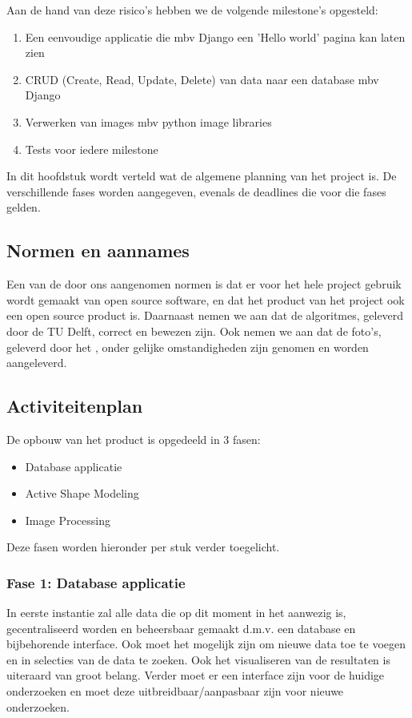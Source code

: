 Aan de hand van deze risico's hebben we de volgende milestone's opgesteld:
\begin{enumerate}
    \item Een eenvoudige applicatie die mbv Django een 'Hello world' pagina kan laten zien
    \item CRUD (Create, Read, Update, Delete) van data naar een database mbv Django
    \item Verwerken van images mbv python image libraries
    \item Tests voor iedere milestone
\end{enumerate}

In dit hoofdstuk wordt verteld wat de algemene planning van het project is. 
De verschillende fases worden aangegeven, evenals de deadlines die voor die fases gelden.


\subsection{Normen en aannames}
Een van de door ons aangenomen normen is dat er voor het hele project gebruik wordt gemaakt van open source software, en dat het product van het project ook een open source product is. 
Daarnaast nemen we aan dat de algoritmes, geleverd door de TU Delft, correct en bewezen zijn.
Ook nemen we aan dat de foto's, geleverd door het \casamproject, onder gelijke omstandigheden zijn genomen en worden aangeleverd.

\subsection{Activiteitenplan}
De opbouw van het product is opgedeeld in 3 fasen:
\begin{itemize}
	\item Database applicatie
	\item Active Shape Modeling
	\item Image Processing
\end{itemize}
Deze fasen worden hieronder per stuk verder toegelicht.

\subsubsection{Fase 1: Database applicatie}
In eerste instantie zal alle data die op dit moment in het \casamproject aanwezig is, gecentraliseerd worden en beheersbaar gemaakt d.m.v. een database en bijbehorende interface. 
Ook moet het mogelijk zijn om nieuwe data toe te voegen en in selecties van de data te zoeken. 
Ook het visualiseren van de resultaten is uiteraard van groot belang. 
Verder moet er een interface zijn voor de huidige onderzoeken en moet deze uitbreidbaar/aanpasbaar zijn voor nieuwe onderzoeken.

